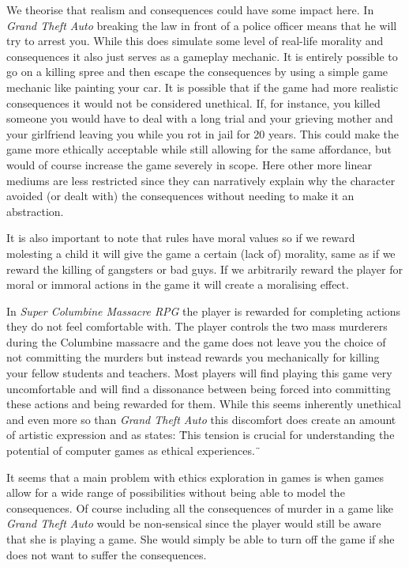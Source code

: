 We theorise that realism and consequences could have some impact here. In \textit{Grand Theft Auto} breaking the law in front of a police officer means that he will try to arrest you. While this does simulate some level of real-life morality and consequences it also just serves as a gameplay mechanic. It is entirely possible to go on a killing spree and then escape the consequences by using a simple game mechanic like painting your car. It is possible that if the game had more realistic consequences it would not be considered unethical. If, for instance, you killed someone you would have to deal with a long trial and your grieving mother and your girlfriend leaving you while you rot in jail for 20 years. This could make the game more ethically acceptable while still allowing for the same affordance, but would of course increase the game severely in scope. Here other more linear mediums are less restricted since they can narratively explain why the character avoided (or dealt with) the consequences without needing to make it an abstraction. \

It is also important to note that rules have moral values so if we reward molesting a child it will give the game a certain (lack of) morality, same as if we reward the killing of gangsters or bad guys. If we arbitrarily reward the player for moral or immoral actions in the game it will create a moralising effect.\

In \textit{Super Columbine Massacre RPG} \citep{ledone2005super} the player is rewarded for completing actions they do not feel comfortable with. The player controls the two mass murderers during the Columbine massacre and the game does not leave you the choice of not committing the murders but instead rewards you mechanically for killing your fellow students and teachers. Most players will find playing this game very uncomfortable and will find a dissonance between being forced into committing these actions and being rewarded for them. While this seems inherently unethical and even more so than \textit{Grand Theft Auto} this discomfort does create an amount of artistic expression and as \citep{sicart2011ethics} states: \"This tension is crucial for understanding the potential of computer games as ethical experiences.\" \

It seems that a main problem with ethics exploration in games is when games allow for a wide range of possibilities without being able to model the consequences. Of course including all the consequences of murder in a game like \textit{Grand Theft Auto} would be non-sensical since the player would still be aware that she is playing a game. She would simply be able to turn off the game if she does not want to suffer the consequences.\

